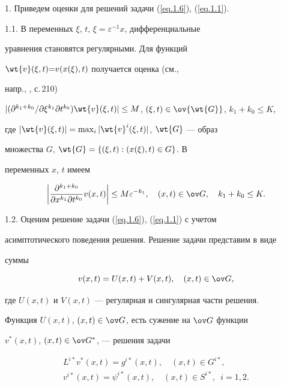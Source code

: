 1. Приведем оценки для решений задачи (\ref{eq.1.6}), (\ref{eq.1.1}).





1.1. В переменных $\xi$, $t$, $\xi=\varepsilon^{-1} x$, дифференциальные


уравнения становятся регулярными. Для функций


$\wt{v}(\xi,t){=}v(x(\xi),t)$ получается оценка (см.,


напр., \cite{9}, с.\,210)


$|(\partial^{k_1+k_0}/\partial \xi^{k_1} \partial t^{k_0})\wt{v}(\xi,


t)|\le M$, $(\xi, t)\in \ov{\wt{G}}$, $k_1+k_0\le K$,


где $|\wt{v}(\xi, t)|=\max_i|\wt{v}^i(\xi, t)|$, $\wt{G}$ --- образ


множества $G$, $\wt{G}=\{(\xi, t): (x(\xi), t)\in G\}$. В


переменных $x$, $t$ имеем


\begin{equation}


\label{eq.4.1}


\bigg|\frac{\partial^{k_1+k_0}}{\partial x^{k_1} \partial t^{k_0}} v(x,


t)\bigg|\le M \varepsilon^{-k_1}, \quad (x, t)\in \ov G,\quad k_1+k_0\le K.


\end{equation}





1.2. Оценим решение задачи (\ref{eq.1.6}), (\ref{eq.1.1}) с учетом


асимптотического поведения решения. Решение задачи представим в виде


суммы


\begin{equation}


\label{eq.4.2}


v(x, t)=U(x, t)+V(x, t), \quad (x, t)\in \ov G,


\end{equation}


где $U(x, t)$ и $V(x, t)$ --- регулярная и сингулярная части решения.


Функция $U(x, t)$, $(x, t)\in \ov G$, есть сужение на $\ov G$ функции


$v^*(x, t)$, $(x, t)\in \ov G^*$, --- решения задачи


\begin{equation}


\label{eq.4.3}


\begin{array}{c}


L^{i*} v^*(x, t)=g^{i*}(x, t), \quad (x, t)\in G^{i*},\\[2mm]


v^{i*}(x, t)=\psi^{i*}(x, t), \quad (x, t)\in S^{i*}, \ \; i=1, 2.


\end{array}


\end{equation}


